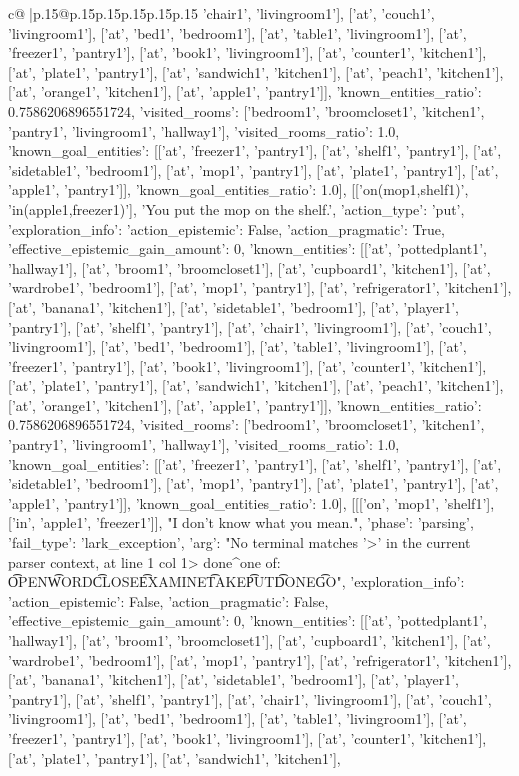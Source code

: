 \documentclass{article}
\begin{document}
{\begin{supertabular}{c@{$\;$}|p{.15\linewidth}@{}p{.15\linewidth}p{.15\linewidth}p{.15\linewidth}p{.15\linewidth}p{.15\linewidth}}
{{{'chair1', 'livingroom1'], ['at', 'couch1', 'livingroom1'], ['at', 'bed1', 'bedroom1'], ['at', 'table1', 'livingroom1'], ['at', 'freezer1', 'pantry1'], ['at', 'book1', 'livingroom1'], ['at', 'counter1', 'kitchen1'], ['at', 'plate1', 'pantry1'], ['at', 'sandwich1', 'kitchen1'], ['at', 'peach1', 'kitchen1'], ['at', 'orange1', 'kitchen1'], ['at', 'apple1', 'pantry1']], 'known_entities_ratio': 0.7586206896551724, 'visited_rooms': ['bedroom1', 'broomcloset1', 'kitchen1', 'pantry1', 'livingroom1', 'hallway1'], 'visited_rooms_ratio': 1.0, 'known_goal_entities': [['at', 'freezer1', 'pantry1'], ['at', 'shelf1', 'pantry1'], ['at', 'sidetable1', 'bedroom1'], ['at', 'mop1', 'pantry1'], ['at', 'plate1', 'pantry1'], ['at', 'apple1', 'pantry1']], 'known_goal_entities_ratio': 1.0}}], [['on(mop1,shelf1)', 'in(apple1,freezer1)'], 'You put the mop on the shelf.', {'action_type': 'put', 'exploration_info': {'action_epistemic': False, 'action_pragmatic': True, 'effective_epistemic_gain_amount': 0, 'known_entities': [['at', 'pottedplant1', 'hallway1'], ['at', 'broom1', 'broomcloset1'], ['at', 'cupboard1', 'kitchen1'], ['at', 'wardrobe1', 'bedroom1'], ['at', 'mop1', 'pantry1'], ['at', 'refrigerator1', 'kitchen1'], ['at', 'banana1', 'kitchen1'], ['at', 'sidetable1', 'bedroom1'], ['at', 'player1', 'pantry1'], ['at', 'shelf1', 'pantry1'], ['at', 'chair1', 'livingroom1'], ['at', 'couch1', 'livingroom1'], ['at', 'bed1', 'bedroom1'], ['at', 'table1', 'livingroom1'], ['at', 'freezer1', 'pantry1'], ['at', 'book1', 'livingroom1'], ['at', 'counter1', 'kitchen1'], ['at', 'plate1', 'pantry1'], ['at', 'sandwich1', 'kitchen1'], ['at', 'peach1', 'kitchen1'], ['at', 'orange1', 'kitchen1'], ['at', 'apple1', 'pantry1']], 'known_entities_ratio': 0.7586206896551724, 'visited_rooms': ['bedroom1', 'broomcloset1', 'kitchen1', 'pantry1', 'livingroom1', 'hallway1'], 'visited_rooms_ratio': 1.0, 'known_goal_entities': [['at', 'freezer1', 'pantry1'], ['at', 'shelf1', 'pantry1'], ['at', 'sidetable1', 'bedroom1'], ['at', 'mop1', 'pantry1'], ['at', 'plate1', 'pantry1'], ['at', 'apple1', 'pantry1']], 'known_goal_entities_ratio': 1.0}}], [[['on', 'mop1', 'shelf1'], ['in', 'apple1', 'freezer1']], "I don't know what you mean.", {'phase': 'parsing', 'fail_type': 'lark_exception', 'arg': "No terminal matches '>' in the current parser context, at line 1 col 1\n\n> done\n^\nExpected one of: \n\t* OPEN\n\t* WORD\n\t* CLOSE\n\t* EXAMINE\n\t* TAKE\n\t* PUT\n\t* DONE\n\t* GO\n", 'exploration_info': {'action_epistemic': False, 'action_pragmatic': False, 'effective_epistemic_gain_amount': 0, 'known_entities': [['at', 'pottedplant1', 'hallway1'], ['at', 'broom1', 'broomcloset1'], ['at', 'cupboard1', 'kitchen1'], ['at', 'wardrobe1', 'bedroom1'], ['at', 'mop1', 'pantry1'], ['at', 'refrigerator1', 'kitchen1'], ['at', 'banana1', 'kitchen1'], ['at', 'sidetable1', 'bedroom1'], ['at', 'player1', 'pantry1'], ['at', 'shelf1', 'pantry1'], ['at', 'chair1', 'livingroom1'], ['at', 'couch1', 'livingroom1'], ['at', 'bed1', 'bedroom1'], ['at', 'table1', 'livingroom1'], ['at', 'freezer1', 'pantry1'], ['at', 'book1', 'livingroom1'], ['at', 'counter1', 'kitchen1'], ['at', 'plate1', 'pantry1'], ['at', 'sandwich1', 'kitchen1'], }}}
\end{supertabular}}
\end{document}
